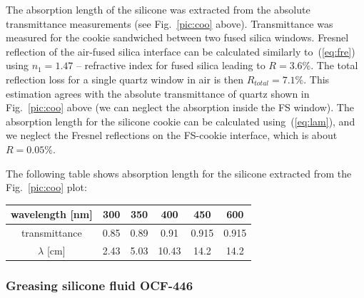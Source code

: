 \documentclass[11pt, a4paper]{article}
\begin{document}
The absorption length of the silicone was extracted from the absolute transmittance measurements (see Fig.~\ref{pic:coo} above). Transmittance was measured for the cookie sandwiched between two fused silica windows. Fresnel reflection of the air-fused silica interface can be calculated similarly to~(\ref{eq:fre}) using $n_1 = 1.47$ -- refractive index for fused silica leading to $R = 3.6 \%$. The total reflection loss for a single quartz window in air is then $R_{total} = 7.1 \%$. This estimation agrees with the absolute transmittance of quartz shown in Fig.~\ref{pic:coo} above (we can neglect the absorption inside the FS window). The absorption length for the silicone cookie can be calculated using~(\ref{eq:lam}), and we neglect the Fresnel reflections on the FS-cookie interface, which is about $R = 0.05 \%$.



The following table shows absorption length for the silicone extracted from the Fig.~\ref{pic:coo} plot:


\begin{center}
\begin{tabular}{| c | c | c | c | c | c|}
\hline
wavelength [nm] & 300 & 350 & 400 & 450 & 600 \\
\hline
transmittance & 0.85 & 0.89 & 0.91 & 0.915 & 0.915 \\
\hline
$\lambda$ [cm] & 2.43 & 5.03 & 10.43 & 14.2 & 14.2 \\
\hline
\end{tabular}
\end{center}

\subsubsection*{Greasing silicone fluid OCF-446}
\end{document}
